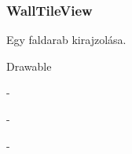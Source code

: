\subsubsection{WallTileView}
\begin{class-template-responsibility}
    Egy faldarab kirajzolása.
\end{class-template-responsibility}
\begin{class-template-interface}
    Drawable
\end{class-template-interface}
\begin{class-template-baseclass}
    -
\end{class-template-baseclass}
\begin{class-template-attribute}
-
\end{class-template-attribute}
\begin{class-template-method}
-
\end{class-template-method}

